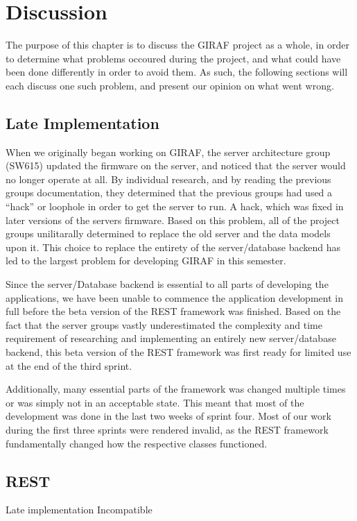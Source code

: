 \chapter{Discussion}
The purpose of this chapter is to discuss the GIRAF project as a whole, in order
to determine what problems occoured during the project, and what could have been
done differently in order to avoid them. As such, the following sections will
each discuss one such problem, and present our opinion on what went wrong.

\section{Late Implementation}
When we originally began working on GIRAF, the server
architecture group (SW615) updated the firmware on the server, and noticed that
the server would no longer operate at all. By individual research, and by
reading the previous groups documentation, they determined that the previous
groups had used a ``hack'' or loophole in order to get the server to run. A
hack, which was fixed in later versions of the servers firmware. Based on this
problem, all of the project groups unilitarally determined to replace the old
server and the data models upon it. This choice to replace the entirety of
the server/database backend has led to the largest problem for developing GIRAF
in this semester.\nl

Since the server/Database backend is essential to all parts of developing the
applications, we have been unable to commence the application development in
full before the beta version of the REST framework was finished. Based on the
fact that the server groups vastly underestimated the complexity and time
requirement of researching and implementing an entirely new server/database
backend, this beta version of the REST framework was first ready for limited use
at the end of the third sprint.\nl





Additionally, many essential parts of the
framework was changed multiple times or was simply not in an acceptable state. This meant that
most of the development was done in the last two weeks of sprint four. Most of
our work during the first three sprints were rendered invalid, as the REST
framework fundamentally changed how the respective classes functioned.

\section{REST}
Late implementation\nl
Incompatible\nl

